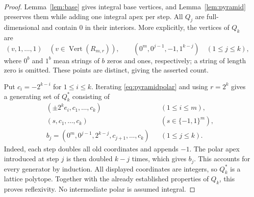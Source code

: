 \documentclass[11pt]{article}
\newcommand{\vertices}{\operatorname{Vert}}
\begin{document}
\begin{proof}
Lemma~\ref{lem:base} gives integral base vertices, and
Lemma~\ref{lem:pyramid} preserves them while adding one integral apex per
step. All $Q_j$ are full-dimensional and contain $0$ in their interiors.
More explicitly, the vertices of $Q_k$ are
\[
 (v,1,\ldots,1)\quad(v\in\vertices(R_{m,r})),\qquad
 (0^m,0^{j-1},-1,1^{k-j})\quad(1\leq j\leq k),
\]
where $0^b$ and $1^b$ mean strings of $b$ zeros and ones, respectively;
a string of length zero is omitted. These points are distinct, giving
the asserted count.

Put $c_i=-2^{k-i}$ for $1\leq i\leq k$.
Iterating \eqref{eq:pyramidpolar} and using $r=2^k$ gives a generating set
of $Q_k^*$ consisting of
\begin{align*}
 &(\pm2^k e_i,c_1,\ldots,c_k) &&(1\leq i\leq m),\\
 &(s,c_1,\ldots,c_k) &&(s\in\{-1,1\}^m),\\
 &b_j=(0^m,0^{j-1},2^{k-j},c_{j+1},\ldots,c_k)
                                      &&(1\leq j\leq k).
\end{align*}
Indeed, each step doubles all old coordinates and appends $-1$.
The polar apex introduced at step $j$ is then doubled $k-j$ times,
which gives $b_j$. This accounts for every generator by induction.
All displayed coordinates are integers, so $Q_k^*$ is a lattice polytope.
Together with the already established properties of $Q_k$, this proves
reflexivity. No intermediate polar is assumed integral.
\end{proof}
\end{document}
